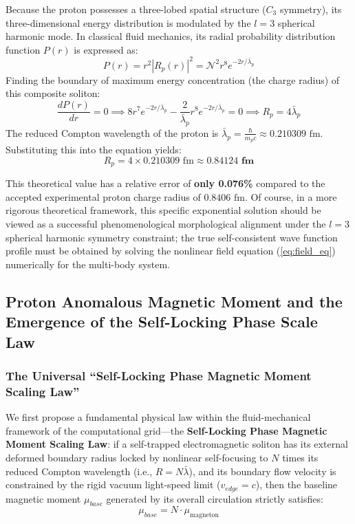 \documentclass[12pt, a4paper]{article}
\begin{document}
Because the proton possesses a three-lobed spatial structure ($C_3$ symmetry), its three-dimensional energy distribution is modulated by the $l=3$ spherical harmonic mode. In classical fluid mechanics, its radial probability distribution function $P(r)$ is expressed as:
\begin{equation}
P(r) = r^2 |R_p(r)|^2 = \mathcal{N}^2 r^8 e^{-2r/\bar{\lambda}_p} \label{eq:proton_radial}
\end{equation}
Finding the boundary of maximum energy concentration (the charge radius) of this composite soliton:
\begin{equation}
\frac{dP(r)}{dr} = 0 \implies 8r^7 e^{-2r/\bar{\lambda}_p} - \frac{2}{\bar{\lambda}_p} r^8 e^{-2r/\bar{\lambda}_p} = 0 \implies R_p = 4 \bar{\lambda}_p \label{eq:radius_deriv}
\end{equation}
The reduced Compton wavelength of the proton is $\bar{\lambda}_p = \frac{\hbar}{m_p c} \approx 0.210309 \text{ fm}$. Substituting this into the equation yields:
\begin{equation}
R_p = 4 \times 0.210309 \text{ fm} \approx \mathbf{0.84124 \text{ fm}} \label{eq:radius_val}
\end{equation}

This theoretical value has a relative error of \textbf{only 0.076\%} compared to the accepted experimental proton charge radius of \textbf{$0.8406 \text{ fm}$}. Of course, in a more rigorous theoretical framework, this specific exponential solution should be viewed as a successful phenomenological morphological alignment under the $l=3$ spherical harmonic symmetry constraint; the true self-consistent wave function profile must be obtained by solving the nonlinear field equation (\ref{eq:field_eq}) numerically for the multi-body system.

\subsection{Proton Anomalous Magnetic Moment and the Emergence of the Self-Locking Phase Scale Law}

\subsubsection{The Universal ``Self-Locking Phase Magnetic Moment Scaling Law''}

We first propose a fundamental physical law within the fluid-mechanical framework of the computational grid—the \textbf{Self-Locking Phase Magnetic Moment Scaling Law}: if a self-trapped electromagnetic soliton has its external deformed boundary radius locked by nonlinear self-focusing to $N$ times its reduced Compton wavelength (i.e., $R = N \bar{\lambda}$), and its boundary flow velocity is constrained by the rigid vacuum light-speed limit ($v_{edge} = c$), then the baseline magnetic moment $\mu_{base}$ generated by its overall circulation strictly satisfies:
\begin{equation}
\mu_{base} = N \cdot \mu_{\text{magneton}} \label{eq:scaling_law}
\end{equation}
\end{document}
